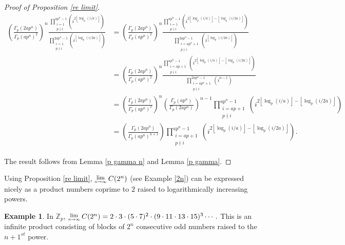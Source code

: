 \documentclass[12pt, letter]{article}    %
\theoremstyle{plain}
\theoremstyle{definition}
\newtheorem{example}[theorem]{Example}
\numberwithin{equation}{section}
\newcommand{\Lim}[1]{\raisebox{0.5ex}{\scalebox{0.8}{$\displaystyle \lim_{#1}\;$}}}
\newcommand{\lemref}[1]{Lemma \ref{#1}}
\newcommand{\propref}[1]{Proposition \ref{#1}}
\newcommand{\exref}[1]{Example \ref{#1}}
\providecommand{\floor}[1]{\left \lfloor #1 \right \rfloor }
\begin{document}
\begin{proof}[Proof of \propref{re limit}]
\begin{align*}
\left(\frac{ \Gamma_p (2ap^n)}{ \Gamma_p (ap^n)^2}\right)^n\frac{\prod\limits_{\substack{i=1 \\ p \nmid i}}^{ap^n-1}\left(i^{2\floor{\log_p(i/a)}}\right)}{\prod\limits_{\substack{i=1 \\ p \nmid i}}^{2ap^n-1}\left(i^{\floor{\log_p(i/2a)}}\right)} 
&=\left(\frac{ \Gamma_p (2ap^n)}{ \Gamma_p (ap^n)^2}\right)^n\frac{ \prod\limits_{\substack{i=1 \\ p \nmid i}}^{ap^n-1}\left(i^{2\floor{\log_p(i/a)}-\floor{\log_p(i/2a)}}\right)}{ \prod\limits_{\substack{i=ap^n+1 \\ p \nmid i }}^{2ap^n-1}\left(i^{\floor{\log_p(i/2a)}}\right)}\\ 
 &=\left(\frac{ \Gamma_p (2ap^n)}{ \Gamma_p (ap^n)^2}\right)^n\frac{ \prod\limits_{\substack{i=ap+1 \\ p \nmid i }}^{ap^n-1}\left(i^{2\floor{\log_p(i/a)}-\floor{\log_p(i/2a)}}\right)}{\prod\limits_{\substack{i=ap^n+1 \\ p \nmid i }}^{2ap^n-1}\left(i^{n-1}\right)}\\ 
&=\left(\frac{ \Gamma_p (2ap^n)}{ \Gamma_p (ap^n)^2}\right)^n\left(\frac{\Gamma_p(ap^n)}{\Gamma_p(2ap^n)}\right)^{n-1}\prod\limits_{\substack{i=ap+1 \\ p \nmid i }}^{ap^n-1}\left(i^{2\floor{\log_p(i/a)}-\floor{\log_p(i/2a)}}\right)\\
 &=\left(\frac{ \Gamma_p (2ap^n)}{ \Gamma_p (ap^n)^{n+1}}\right)\prod\limits_{\substack{i=ap+1 \\ p \nmid i }}^{ap^n-1}\left(i^{2\floor{\log_p(i/a)}-\floor{\log_p(i/2a)}}\right).
\end{align*}

\noindent The result follows from \lemref{p gamma n} and \lemref{p gamma}.\end{proof}

Using \propref{re limit}, $\Lim{n\rightarrow\infty}C(2^n)$ (see \exref{2n}) can be expressed nicely as a product numbers coprime to $2$ raised to logarithmically increasing powers. 

\begin{example}
In $\mathbb{Z}_p$, $\Lim{n\rightarrow\infty}C(2^n)=2\cdot3\cdot(5\cdot7)^2\cdot(9\cdot11\cdot13\cdot15)^3\cdots.$ This is an infinite product consisting of blocks of $2^n$ consecutive odd numbers raised to the $n+1^{st}$ power.
\end{example}
\end{document}
